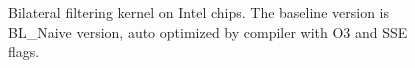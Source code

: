 \documentclass{IEEEtran}
\begin{document}
\begin{figure}[t!] 
\begin{centering} 
\end{centering}
\caption{Bilateral filtering kernel on Intel chips. The baseline version is BL\_Naive version, auto optimized by compiler with O3 and SSE flags.} 
\label{fig:comparisonIntel} 
\end{figure} 
\end{document}
